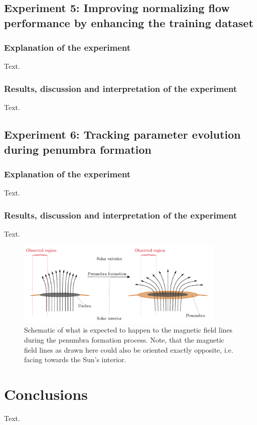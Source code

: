 \documentclass[a4paper,12pt]{report}
\begin{document}
\section{Experiment 5: Improving normalizing flow performance by enhancing the training dataset}
\subsection{Explanation of the experiment}
Text.

\subsection{Results, discussion and interpretation of the experiment}
Text.

\section{Experiment 6: Tracking parameter evolution during penumbra formation}
\subsection{Explanation of the experiment}
Text.

\subsection{Results, discussion and interpretation of the experiment}
Text.

\begin{figure}[h]
\centering
\includegraphics[width=10cm]{figures/penumbraformation.pdf}
\caption{Schematic of what is expected to happen to the magnetic field lines during the penumbra formation process. Note, that the magnetic field lines as drawn here could also be oriented exactly opposite, i.e. facing towards the Sun's interior.}
\label{fig:penumbraformation}
\end{figure}

\chapter{Conclusions}
Text.
\end{document}
